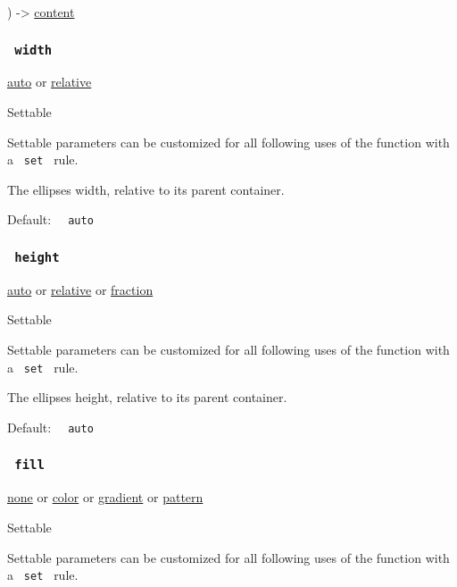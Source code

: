 ) -\textgreater{} \href{/docs/reference/foundations/content/}{content}

\subsubsection{\texorpdfstring{\texttt{\ width\ }}{ width }}\label{parameters-width}

\href{/docs/reference/foundations/auto/}{auto} {or}
\href{/docs/reference/layout/relative/}{relative}

{{ Settable }}

\label{parameters-width-settable-tooltip}
Settable parameters can be customized for all following uses of the
function with a \texttt{\ set\ } rule.

The ellipse\textquotesingle s width, relative to its parent container.

Default: \texttt{\ }{\texttt{\ auto\ }}\texttt{\ }

\subsubsection{\texorpdfstring{\texttt{\ height\ }}{ height }}\label{parameters-height}

\href{/docs/reference/foundations/auto/}{auto} {or}
\href{/docs/reference/layout/relative/}{relative} {or}
\href{/docs/reference/layout/fraction/}{fraction}

{{ Settable }}

\label{parameters-height-settable-tooltip}
Settable parameters can be customized for all following uses of the
function with a \texttt{\ set\ } rule.

The ellipse\textquotesingle s height, relative to its parent container.

Default: \texttt{\ }{\texttt{\ auto\ }}\texttt{\ }

\subsubsection{\texorpdfstring{\texttt{\ fill\ }}{ fill }}\label{parameters-fill}

\href{/docs/reference/foundations/none/}{none} {or}
\href{/docs/reference/visualize/color/}{color} {or}
\href{/docs/reference/visualize/gradient/}{gradient} {or}
\href{/docs/reference/visualize/pattern/}{pattern}

{{ Settable }}

\label{parameters-fill-settable-tooltip}
Settable parameters can be customized for all following uses of the
function with a \texttt{\ set\ } rule.

